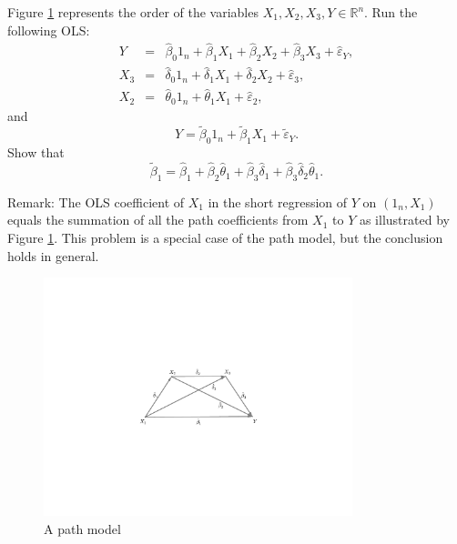Figure \ref{fig::path} represents the order of the variables $X_1, X_2, X_3, Y \in \mathbb{R}^n$. Run the following OLS:
\begin{eqnarray*}
Y &=& \hat{\beta}_0 1_n  + \hat{\beta}_1 X_1 + \hat{\beta}_2 X_2 + \hat{\beta}_3 X_3 + \hat{\varepsilon}_Y, \\
X_3 &=&   \hat{\delta}_0 1_n+ \hat{\delta}_1 X_1 + \hat{\delta}_2 X_2 +  \hat{\varepsilon}_3, \\
X_2 &=&  \hat{\theta}_0 1_n+ \hat{\theta}_1 X_1 +  \hat{\varepsilon}_2,
\end{eqnarray*}
and
$$
Y = \tilde{\beta}_0 1_n+ \tilde{\beta}_1 X_1 + \tilde{\varepsilon}_Y.
$$
Show that 
$$
 \tilde{\beta}_1 =  \hat{\beta}_1  +  \hat{\beta}_2\hat{\theta}_1  +  \hat{\beta}_3 \hat{\delta}_1 +  \hat{\beta}_3 \hat{\delta}_2  \hat{\theta}_1 .
$$

Remark: The OLS coefficient of $X_1$ in the short regression of $Y$ on $(1_n, X_1)$ equals the summation of all the path coefficients from $X_1$ to $Y$ as illustrated by Figure \ref{fig::path}. This problem is a special case of the path model, but the conclusion holds in general. 

\begin{figure}
\centering
\includegraphics[width = 0.8\textwidth]{figures/path_cochran.pdf}
\caption{A path model}\label{fig::path}
\end{figure} 







